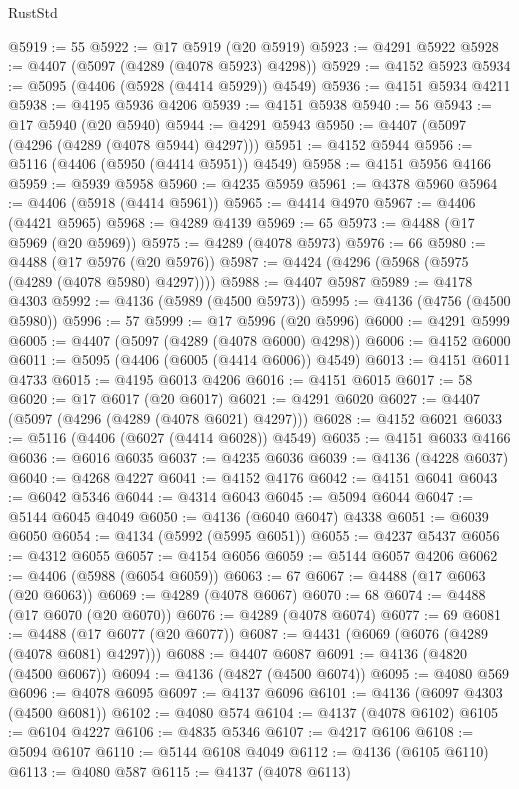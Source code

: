 \begin{lexlean}{RustStd}
\begin{coremodule}
{\begin{coremodule}
{{{{{{{{{{{{{{{{{{{{{{{{{{{{{{{{{{{{{{{{{{{{{{{{{{@5919 := 55
@5922 := @17 @5919 (@20 @5919)
@5923 := @4291 @5922
@5928 := @4407 (@5097 (@4289 (@4078 @5923) @4298))
@5929 := @4152 @5923
@5934 := @5095 (@4406 (@5928 (@4414 @5929)) @4549)
@5936 := @4151 @5934 @4211
@5938 := @4195 @5936 @4206
@5939 := @4151 @5938
@5940 := 56
@5943 := @17 @5940 (@20 @5940)
@5944 := @4291 @5943
@5950 := @4407 (@5097 (@4296 (@4289 (@4078 @5944) @4297)))
@5951 := @4152 @5944
@5956 := @5116 (@4406 (@5950 (@4414 @5951)) @4549)
@5958 := @4151 @5956 @4166
@5959 := @5939 @5958
@5960 := @4235 @5959
@5961 := @4378 @5960
@5964 := @4406 (@5918 (@4414 @5961))
@5965 := @4414 @4970
@5967 := @4406 (@4421 @5965)
@5968 := @4289 @4139
@5969 := 65
@5973 := @4488 (@17 @5969 (@20 @5969))
@5975 := @4289 (@4078 @5973)
@5976 := 66
@5980 := @4488 (@17 @5976 (@20 @5976))
@5987 := @4424 (@4296 (@5968 (@5975 (@4289 (@4078 @5980) @4297))))
@5988 := @4407 @5987
@5989 := @4178 @4303
@5992 := @4136 (@5989 (@4500 @5973))
@5995 := @4136 (@4756 (@4500 @5980))
@5996 := 57
@5999 := @17 @5996 (@20 @5996)
@6000 := @4291 @5999
@6005 := @4407 (@5097 (@4289 (@4078 @6000) @4298))
@6006 := @4152 @6000
@6011 := @5095 (@4406 (@6005 (@4414 @6006)) @4549)
@6013 := @4151 @6011 @4733
@6015 := @4195 @6013 @4206
@6016 := @4151 @6015
@6017 := 58
@6020 := @17 @6017 (@20 @6017)
@6021 := @4291 @6020
@6027 := @4407 (@5097 (@4296 (@4289 (@4078 @6021) @4297)))
@6028 := @4152 @6021
@6033 := @5116 (@4406 (@6027 (@4414 @6028)) @4549)
@6035 := @4151 @6033 @4166
@6036 := @6016 @6035
@6037 := @4235 @6036
@6039 := @4136 (@4228 @6037)
@6040 := @4268 @4227
@6041 := @4152 @4176
@6042 := @4151 @6041
@6043 := @6042 @5346
@6044 := @4314 @6043
@6045 := @5094 @6044
@6047 := @5144 @6045 @4049
@6050 := @4136 (@6040 @6047) @4338
@6051 := @6039 @6050
@6054 := @4134 (@5992 (@5995 @6051))
@6055 := @4237 @5437
@6056 := @4312 @6055
@6057 := @4154 @6056
@6059 := @5144 @6057 @4206
@6062 := @4406 (@5988 (@6054 @6059))
@6063 := 67
@6067 := @4488 (@17 @6063 (@20 @6063))
@6069 := @4289 (@4078 @6067)
@6070 := 68
@6074 := @4488 (@17 @6070 (@20 @6070))
@6076 := @4289 (@4078 @6074)
@6077 := 69
@6081 := @4488 (@17 @6077 (@20 @6077))
@6087 := @4431 (@6069 (@6076 (@4289 (@4078 @6081) @4297)))
@6088 := @4407 @6087
@6091 := @4136 (@4820 (@4500 @6067))
@6094 := @4136 (@4827 (@4500 @6074))
@6095 := @4080 @569
@6096 := @4078 @6095
@6097 := @4137 @6096
@6101 := @4136 (@6097 @4303 (@4500 @6081))
@6102 := @4080 @574
@6104 := @4137 (@4078 @6102)
@6105 := @6104 @4227
@6106 := @4835 @5346
@6107 := @4217 @6106
@6108 := @5094 @6107
@6110 := @5144 @6108 @4049
@6112 := @4136 (@6105 @6110)
@6113 := @4080 @587
@6115 := @4137 (@4078 @6113)
}}}}}}}}}}}}}}}}}}}}}}}}}}}}}}}}}}}}}}}}}}}}}}}}}}
\end{coremodule}}
\end{coremodule}
\end{lexlean}
